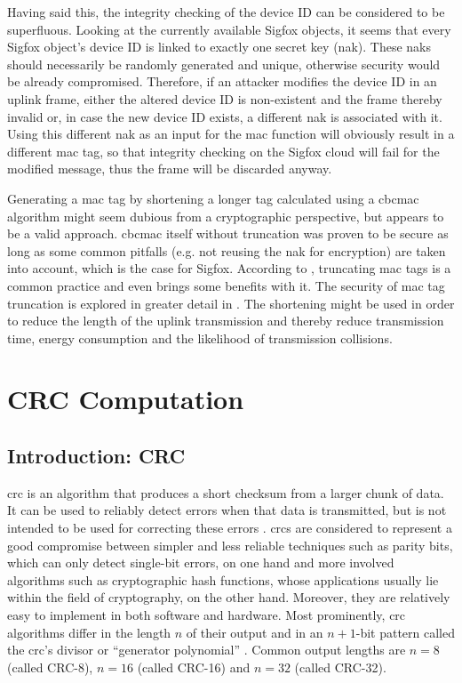 Having said this, the integrity checking of the device ID can be considered to be superfluous.
Looking at the currently available Sigfox objects, it seems that every Sigfox object's device ID is linked to exactly one secret key (\gls{nak}).
These \glspl{nak} should necessarily be randomly generated and unique, otherwise security would be already compromised.
Therefore, if an attacker modifies the device ID in an uplink frame, either the altered device ID is non-existent and the frame thereby invalid or, in case the new device ID exists, a different \gls{nak} is associated with it.
Using this different \gls{nak} as an input for the \gls{mac} function will obviously result in a different \gls{mac} tag, so that integrity checking on the Sigfox cloud will fail for the modified message, thus the frame will be discarded anyway.

Generating a \gls{mac} tag by shortening a longer tag calculated using a \gls{cbcmac} algorithm might seem dubious from a cryptographic perspective, but appears to be a valid approach.
\gls{cbcmac} itself without truncation was proven to be secure \cite{cbcmac_security} as long as some common pitfalls \cite{cbcmac_pitfalls} (e.g. not reusing the \gls{nak} for encryption) are taken into account, which is the case for Sigfox.
According to \cite[Section 5]{rfc2104}, truncating \gls{mac} tags is a common practice and even brings some benefits with it.
The security of \gls{mac} tag truncation is explored in greater detail in \cite{cbcmac_truncation}.
The shortening might be used in order to reduce the length of the uplink transmission and thereby reduce transmission time, energy consumption and the likelihood of transmission collisions.

\FloatBarrier
\section{CRC Computation}
\label{sec:uplink_crc}
\subsection{Introduction: CRC}
\label{sec:uplink_crc_introduction}
\gls{crc} is an algorithm that produces a short checksum from a larger chunk of data.
It can be used to reliably detect errors when that data is transmitted, but is not intended to be used for correcting these errors \cite{hackersdelight}.
\glspl{crc} are considered to represent a good compromise between simpler and less reliable techniques such as parity bits, which can only detect single-bit errors, on one hand and more involved algorithms such as cryptographic hash functions, whose applications usually lie within the field of cryptography, on the other hand.
Moreover, they are relatively easy to implement in both software and hardware.
Most prominently, \gls{crc} algorithms differ in the length $n$ of their output and in an $n + 1$-bit pattern called the \gls{crc}'s divisor or ``generator polynomial'' \cite{hackersdelight}.
Common output lengths are $n = 8$ (called CRC-8), $n = 16$ (called CRC-16) and $n = 32$ (called CRC-32).

